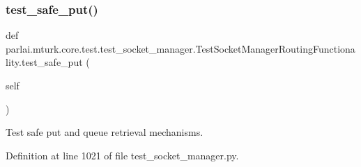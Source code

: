 \subsubsection{\texorpdfstring{test\+\_\+safe\+\_\+put()}{test\_safe\_put()}}
{\footnotesize\ttfamily def parlai.\+mturk.\+core.\+test.\+test\+\_\+socket\+\_\+manager.\+Test\+Socket\+Manager\+Routing\+Functionality.\+test\+\_\+safe\+\_\+put (\begin{DoxyParamCaption}\item[{}]{self }\end{DoxyParamCaption})}

\begin{DoxyVerb}Test safe put and queue retrieval mechanisms.
\end{DoxyVerb}
 

Definition at line 1021 of file test\+\_\+socket\+\_\+manager.\+py.


